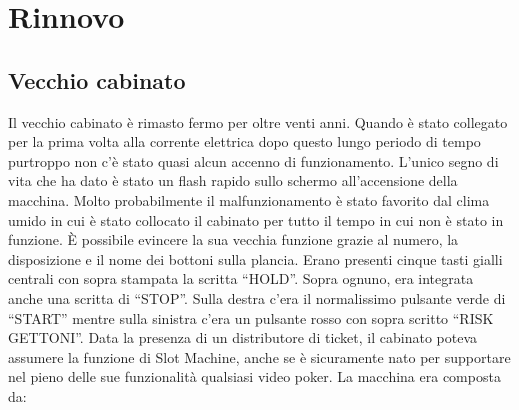 \chapter{Rinnovo}
\section{Vecchio cabinato}
Il vecchio cabinato è rimasto fermo per oltre venti anni. Quando è stato collegato per la prima volta alla corrente elettrica dopo questo lungo periodo di tempo purtroppo non c’è stato quasi alcun accenno di funzionamento. L’unico segno di vita che ha dato è stato un flash rapido sullo schermo all’accensione della macchina. Molto probabilmente il malfunzionamento è stato favorito dal clima umido in cui è stato collocato il cabinato per tutto il tempo in cui non è stato in funzione. È possibile evincere la sua vecchia funzione grazie al numero, la disposizione e il nome dei bottoni sulla plancia. Erano presenti cinque tasti gialli centrali con sopra stampata la scritta “HOLD”. Sopra ognuno, era integrata anche una scritta di “STOP”. Sulla destra c’era il normalissimo pulsante verde di “START” mentre sulla sinistra c’era un pulsante rosso con sopra scritto “RISK GETTONI”. Data la presenza di un distributore di ticket, il cabinato poteva assumere la funzione di Slot Machine, anche se è sicuramente nato per supportare nel pieno delle sue funzionalità qualsiasi video poker. La macchina era composta da:

